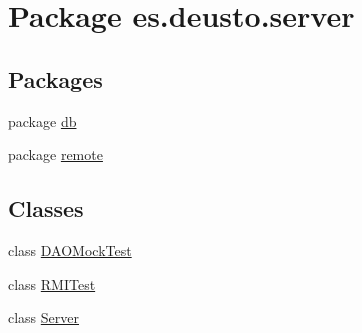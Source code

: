 \hypertarget{namespacees_1_1deusto_1_1server}{}\section{Package es.\+deusto.\+server}
\label{namespacees_1_1deusto_1_1server}
\subsection*{Packages}
\begin{DoxyCompactItemize}
\item 
package \hyperlink{namespacees_1_1deusto_1_1server_1_1db}{db}
\item 
package \hyperlink{namespacees_1_1deusto_1_1server_1_1remote}{remote}
\end{DoxyCompactItemize}
\subsection*{Classes}
\begin{DoxyCompactItemize}
\item 
class \hyperlink{classes_1_1deusto_1_1server_1_1_d_a_o_mock_test}{D\+A\+O\+Mock\+Test}
\item 
class \hyperlink{classes_1_1deusto_1_1server_1_1_r_m_i_test}{R\+M\+I\+Test}
\item 
class \hyperlink{classes_1_1deusto_1_1server_1_1_server}{Server}
\end{DoxyCompactItemize}
